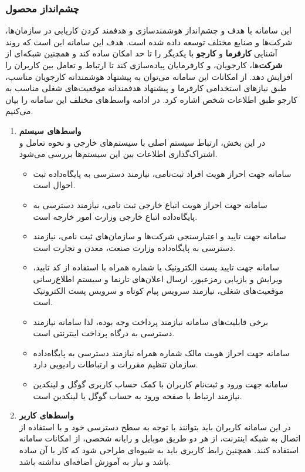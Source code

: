 \documentclass[12pt]{article}
\begin{document}
	\subsubsection{چشم‌انداز محصول}
	این سامانه با هدف و چشم‌انداز هوشمند‌سازی و هدفمند کردن کاریابی در سازمان‌ها، شرکت‌ها و صنایع مختلف توسعه داده شده است. هدف این سامانه این است که روند آشنایی \textbf{کارفرما} و \textbf{کارجو} با یکدیگر را تا حد امکان ساده کند و همچنین شبکه‌ای از \textbf{شرکت}‌ها، کارجویان، و کارفرمایان پیاده‌سازی کند تا ارتباط و تعامل بین کاربران را افزایش دهد. از امکانات این سامانه می‌توان به پیشنهاد هوشمندانه کارجویان مناسب، طبق نیاز‌های استخدامی کارفرما و پیشنهاد هدفمندانه موقعیت‌های شغلی مناسب به کارجو طبق اطلاعات شخص اشاره کرد.
	در ادامه واسط‌های مختلف این سامانه را بیان می‌کنیم.
	\begin{enumerate}
		\item
		\textbf{واسط‌های سیستم}\\
		در این بخش، ارتباط سیستم اصلی با سیستم‌های خارجی و نحوه تعامل و اشتراک‌گذاری اطلاعات بین این سیستم‌ها بررسی می‌شود.
		\begin{itemize}
			\item
			سامانه جهت احراز هویت افراد ثبت‌نامی، نیازمند دسترسی به پایگاه‌داده ثبت احوال است.
			\item
			سامانه جهت احراز هویت اتباع خارجی ثبت نامی، نیازمند دسترسی به پایگاه‌داده اتباع خارجی وزارت امور خارجه است.
			\item
			سامانه جهت تایید و اعتبارسنجی شرکت‌ها و سازمان‌‌های ثبت نامی، نیازمند دسترسی به پایگاه‌داده وزارت صنعت، معدن و تجارت است.
			\item
			سامانه جهت تایید پست الکترونیک یا شماره همراه با استفاده از کد تایید، ویرایش و بازیابی رمز‌عبور، ارسال اعلان‌های تارنما و سیستم اطلاع‌رسانی موقعیت‌های شغلی،‌ نیازمند سرویس پیام کوتاه و سرویس پست الکترونیک است.
			\item
			برخی قابلیت‌های سامانه نیازمند پرداخت وجه بوده، لذا سامانه نیازمند دسترسی به درگاه پرداخت اینترنتی است.
			\item
			سامانه جهت احراز هویت مالک شماره همراه نیازمند دسترسی به پایگاه‌داده سازمان تنظیم مقررات و ارتباطات رادیویی دارد.
			\item
			سامانه جهت ورود و ثبت‌نام کاربران با کمک حساب کاربری گوگل و لینکدین نیازمند ارتباط با صفحه ورود به حساب گوگل یا لینکدین است.
		\end{itemize}
		\item
		\textbf{واسط‌های کاربر}\\
		در این سامانه کاربران باید بتوانند با توجه به سطح دسترسی خود و با استفاده از اتصال به شبکه اینترنت، از هر دو طریق موبایل و رایانه شخصی، از امکانات سامانه استفاده کنند. همچنین رابط کاربری باید به شیوه‌ای طراحی شود که کار با آن ساده باشد و نیاز به آموزش اضافه‌ای نداشته باشد.


\end{enumerate}
\end{document}
